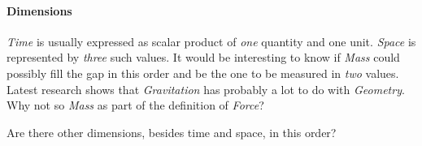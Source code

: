 %
%
%
%
%
%
%

\paragraph{Dimensions}
\label{dimensions_heading}

\emph{Time} is usually expressed as scalar product of \emph{one} quantity and
one unit. \emph{Space} is represented by \emph{three} such values. It would be
interesting to know if \emph{Mass} could possibly fill the gap in this order and
be the one to be measured in \emph{two} values. Latest research shows that
\emph{Gravitation} has probably a lot to do with \emph{Geometry}. Why not so
\emph{Mass} as part of the definition of \emph{Force}?

Are there other dimensions, besides time and space, in this order?
